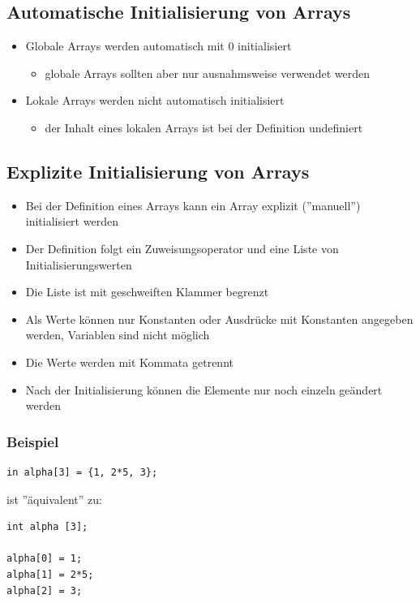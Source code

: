 \subsection{Automatische Initialisierung von Arrays}
\label{sec:Automatische Initialisierung von Arrays}
\begin{itemize}
	\item Globale Arrays werden automatisch mit 0 initialisiert
	\begin{itemize}
		\item globale Arrays sollten aber nur ausnahmsweise verwendet werden
	\end{itemize}
	\item Lokale Arrays werden nicht automatisch initialisiert
	\begin{itemize}
		\item der Inhalt eines lokalen Arrays ist bei der Definition undefiniert
	\end{itemize}
\end{itemize}

\subsection{Explizite Initialisierung von Arrays}
\label{sec:Explizite Initialisierung von Arrays}
\begin{itemize}
	\item Bei der Definition eines Arrays kann ein Array explizit (''manuell'') initialisiert werden
	\item Der Definition folgt ein Zuweisungsoperator und eine Liste von Initialisierungswerten
	\item Die Liste ist mit geschweiften Klammer begrenzt
	\item Als Werte können nur Konstanten oder Ausdrücke mit Konstanten angegeben werden, \color{red}Variablen sind nicht möglich\color{black}
	\item Die Werte werden mit Kommata getrennt
	\item Nach der Initialisierung können die Elemente nur noch einzeln geändert werden
\end{itemize}

\subsubsection{Beispiel}
\label{sec:ecplizites Array Beispiel}
\noindent
\begin{minipage}{\linewidth}
\begin{lstlisting}
in alpha[3] = {1, 2*5, 3};
\end{lstlisting}
\end{minipage}
ist ''äquivalent'' zu:
\noindent
\begin{minipage}{\linewidth}
\begin{lstlisting}
int alpha [3];

alpha[0] = 1;
alpha[1] = 2*5;
alpha[2] = 3;
\end{lstlisting}
\end{minipage}

